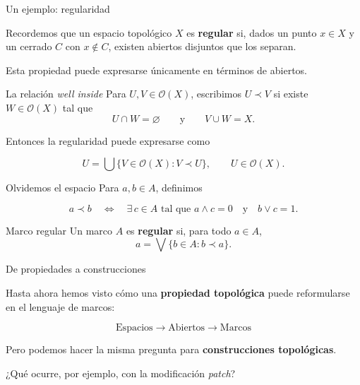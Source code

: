 \documentclass[compress,12pt]{beamer}
\begin{document}
\begin{frame}{Un ejemplo: regularidad}
\small

Recordemos que un espacio topológico $X$ es \textbf{regular} si,
dados un punto $x\in X$ y un cerrado $C$ con $x\notin C$,
existen abiertos disjuntos que los separan.

\pause

\medskip

Esta propiedad puede expresarse únicamente en términos de abiertos.

\begin{block}{La relación \textit{well inside}}
Para $U,V\in\mathcal O(X)$, escribimos $U\prec V$ si existe $W\in\mathcal O(X)$ tal que
\[
    U\cap W=\varnothing
    \qquad\text{y}\qquad
    V\cup W=X.
\]
\end{block}

\pause

Entonces la regularidad puede expresarse como

\[
    U
    =
    \bigcup\{V\in\mathcal O(X):V\prec U\},
    \qquad U\in\mathcal O(X).
\]

\end{frame}

\begin{frame}{Olvidemos el espacio}
\small
Para $a,b\in A$, definimos

\[
    a\prec b
    \quad\Longleftrightarrow\quad
    \exists\,c\in A
    \text{ tal que }
    a\wedge c=0
    \quad\text{y}\quad
    b\vee c=1.
\]

\pause

\medskip

\begin{block}{Marco regular}
Un marco $A$ es \textbf{regular} si, para todo $a\in A$,
\[
    a=\bigvee\{b\in A:b\prec a\}.
\]
\end{block}

\pause

\vfill

\begin{center}
\end{center}

\end{frame}

\begin{frame}{De propiedades a construcciones}

Hasta ahora hemos visto cómo una \textbf{propiedad topológica}
puede reformularse en el lenguaje de marcos:

\[
\boxed{
\text{Espacios}
\longrightarrow
\text{Abiertos}
\longrightarrow
\text{Marcos}
}
\]

\pause

\medskip

Pero podemos hacer la misma pregunta para
\textbf{construcciones topológicas}.

\pause

\bigskip

\begin{center}
\Large
¿Qué ocurre, por ejemplo, con la modificación \textit{patch}?
\end{center}

\end{frame}
\end{document}
